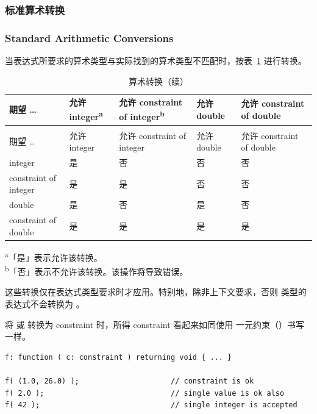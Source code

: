 \subsubsection{标准算术转换}
\subsubsection*{Standard Arithmetic Conversions}

当表达式所要求的算术类型与实际找到的算术类型不匹配时，按表~\ref{tab:pxl-arith-conv} 进行转换。

\begin{longtable}{@{}p{}
  >{\centering\arraybackslash}p{}
  >{\centering\arraybackslash}p{}
  >{\centering\arraybackslash}p{}
  >{\centering\arraybackslash}p{}@{}}
\caption{算术转换}\label{tab:pxl-arith-conv}\\
\toprule
期望 \ldots & 允许 integer\textsuperscript{a} & 允许 constraint of integer\textsuperscript{b} & 允许 double & 允许 constraint of double \\
\midrule
\endfirsthead
\caption[]{算术转换（续）}\\
\toprule
期望 \ldots & 允许 integer & 允许 constraint of integer & 允许 double & 允许 constraint of double \\
\midrule
\endhead
\bottomrule
\endfoot
integer & 是 & 否 & 否 & 否 \\
constraint of integer & 是 & 是 & 否 & 否 \\
double & 是 & 否 & 是 & 否 \\
constraint of double & 是 & 是 & 是 & 是 \\
\end{longtable}

{\footnotesize
\textsuperscript{a}「是」表示允许该转换。\\
\textsuperscript{b}「否」表示不允许该转换。该操作将导致错误。
}

这些转换仅在表达式类型要求时才应用。特别地，除非上下文要求，否则  类型的表达式不会转换为 。

将  或  转换为 constraint 时，所得 constraint 看起来如同使用 \cmd{==} 一元约束（）书写一样。
\begin{lstlisting}[style=pxl]
f: function ( c: constraint ) returning void { ... }

f( (1.0, 26.0) );                     // constraint is ok
f( 2.0 );                             // single value is ok also
f( 42 );                              // single integer is accepted
\end{lstlisting}

